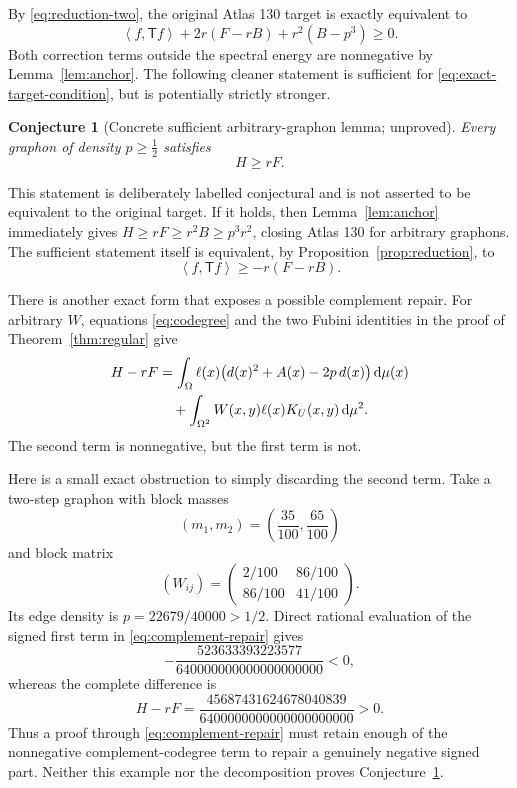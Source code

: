 \documentclass[11pt]{article}
\newtheorem{conjecture}[theorem]{Conjecture}
\newcommand{\dd}{\,\mathrm d}
\newcommand{\ip}[2]{\left\langle #1,#2\right\rangle}
\newcommand{\TT}{\mathsf T}
\begin{document}
By \eqref{eq:reduction-two}, the original Atlas 130 target is exactly
equivalent to
\begin{equation}
 \ip f{\TT f}+2r(F-rB)+r^2(B-p^3)\geq0.
 \label{eq:exact-target-condition}
\end{equation}
Both correction terms outside the spectral energy are nonnegative by
Lemma~\ref{lem:anchor}.  The following cleaner statement is sufficient for
\eqref{eq:exact-target-condition}, but is potentially strictly stronger.

\begin{conjecture}[Concrete sufficient arbitrary-graphon lemma; unproved]
\label{conj:remaining}
Every graphon of density $p\geq\tfrac12$ satisfies
\begin{equation}
 \boxed{H\geq rF.}
 \label{eq:conjecture}
\end{equation}
\end{conjecture}

This statement is deliberately labelled conjectural and is not asserted to
be equivalent to the original target.  If it holds, then
Lemma~\ref{lem:anchor} immediately gives
$H\geq rF\geq r^2B\geq p^3r^2$, closing Atlas 130 for arbitrary graphons.
The sufficient statement itself is equivalent, by
Proposition~\ref{prop:reduction}, to
\[
 \ip f{\TT f}\geq-r(F-rB).
\]

There is another exact form that exposes a possible complement repair.
For arbitrary $W$, equations \eqref{eq:codegree} and the two Fubini
identities in the proof of Theorem~\ref{thm:regular} give
\begin{align}
 H-rF
 &=\int_\Omega \ell(x)
   \bigl(d(x)^2+A(x)-2p\,d(x)\bigr)\dd\mu(x) \notag\\
 &\quad+\int_{\Omega^2}W(x,y)\ell(x)K_U(x,y)\dd\mu^2.
 \label{eq:complement-repair}
\end{align}
The second term is nonnegative, but the first term is not.

Here is a small exact obstruction to simply discarding the second term.
Take a two-step graphon with block masses
\[
 (m_1,m_2)=\left(\frac{35}{100},\frac{65}{100}\right)
\]
and block matrix
\[
 (W_{ij})=
 \begin{pmatrix}
  2/100&86/100\\
  86/100&41/100
 \end{pmatrix}.
\]
Its edge density is $p=22679/40000>1/2$.  Direct rational evaluation
of the signed first term in \eqref{eq:complement-repair} gives
\begin{equation}
 -\frac{523633393223577}{640000000000000000000}<0,
 \label{eq:signed-obstruction}
\end{equation}
whereas the complete difference is
\begin{equation}
 H-rF=
 \frac{45687431624678040839}{6400000000000000000000}>0.
 \label{eq:repaired-example}
\end{equation}
Thus a proof through \eqref{eq:complement-repair} must retain enough of the
nonnegative complement-codegree term to repair a genuinely negative signed
part.  Neither this example nor the decomposition proves
Conjecture~\ref{conj:remaining}.
\end{document}
